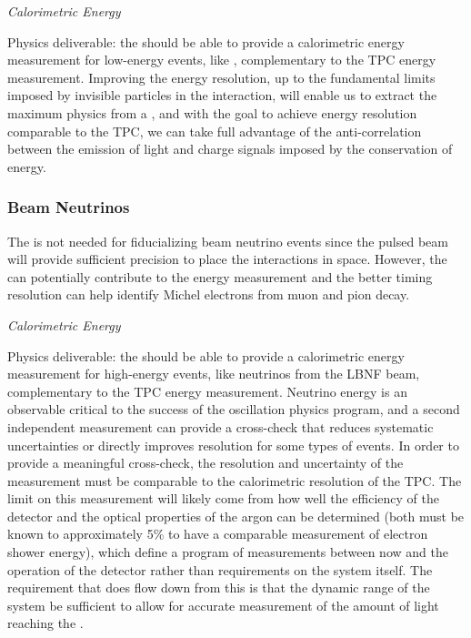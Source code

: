 \textit{Calorimetric Energy}

Physics deliverable: the  should be able to provide a calorimetric energy measurement for low-energy events, like , complementary to the TPC energy measurement. 
Improving the energy resolution, up to the fundamental limits imposed by invisible particles in the interaction, will enable us to extract the maximum physics from a , and with the goal to achieve energy resolution comparable to the TPC, we can take full advantage of the anti-correlation between the emission of light and charge signals imposed by the conservation of energy.



\subsubsection{Beam Neutrinos}

The  is not needed for fiducializing beam neutrino events since the pulsed beam will provide sufficient precision to place the interactions in space. However, the  can potentially contribute to the energy measurement and the better timing resolution can help identify Michel electrons from muon and pion decay.


\textit{\it Calorimetric Energy}

Physics deliverable: the  should be able to provide a calorimetric energy measurement for high-energy events, like neutrinos from the LBNF beam, complementary to the TPC energy measurement.
Neutrino energy is an observable critical to the success of the oscillation physics program, and a second independent measurement can provide a cross-check that reduces systematic uncertainties or directly improves resolution for some types of events. In order to provide a meaningful cross-check, the resolution and uncertainty of the  measurement must be comparable to the calorimetric resolution of the TPC. The limit on this measurement will likely come from how well the efficiency of the detector and the optical properties of the argon can be determined (both must be known to approximately 5\% to have a comparable measurement of electron shower energy), which define a program of measurements between now and the operation of the detector rather than requirements on the system itself. The requirement that does flow down from this is that the dynamic range of the system be sufficient to allow for accurate measurement of the amount of light reaching the . 

